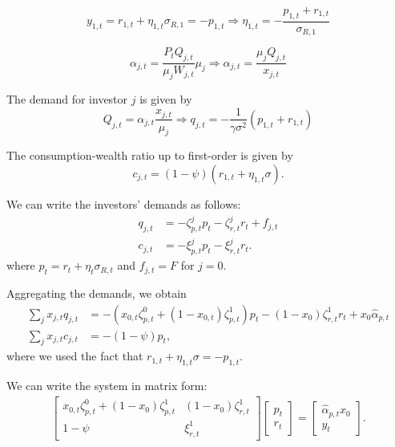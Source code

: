 \documentclass[11pt,english]{article}
\begin{document}
\begin{equation}
    y_{1,t} = r_{1,t} + \eta_{1,t} \sigma_{R,1} = - p_{1,t} \Rightarrow\eta_{1,t} = -\frac{p_{1,t}+r_{1,t}}{\sigma_{R,1}}
\end{equation}

\begin{equation}
    \alpha_{j,t} = \frac{P_t Q_{j,t}}{\mu_j W_{j,t}} \mu_j \Rightarrow \alpha_{j,t} = \frac{\mu_j Q_{j,t}}{x_{j,t}} 
\end{equation}

The demand for investor $j$ is given by
\begin{equation}
    Q_{j,t} = \alpha_{j,t} \frac{x_{j,t}}{\mu_j} \Rightarrow q_{j,t} =  - \frac{1}{\gamma \sigma^2} (p_{1,t}+r_{1,t})
\end{equation}

The consumption-wealth ratio up to first-order is given by
\begin{equation}
    c_{j,t} = (1-\psi) ( r_{1,t} + \eta_{1,t} \sigma). 
\end{equation}

We can write the investors' demands as follows:
\begin{align}
    q_{j,t} &= -\zeta_{p,t}^j p_t - \zeta_{r,t}^j r_t + f_{j,t}\\
    c_{j,t} &= -\xi_{p,t}^j p_t - \xi_{r,t}^j r_t.
\end{align}
where $p_t = r_t + \eta_t \sigma_{R,t}$ and $f_{j,t}=F$ for $j=0$.

Aggregating the demands, we obtain
\begin{align}
    \sum_{j} x_{j,t} q_{j,t} &= - (x_{0,t} \zeta_{p,t}^0 + (1-x_{0,t}) \zeta_{p,t}^1) p_t - (1-x_0) \zeta_{r,t}^1 r_t + x_0 \hat{\alpha}_{p,t}\\
    \sum_{j} x_{j,t} c_{j,t} &= -(1-\psi) p_t,
\end{align}
where we used the fact that $r_{1,t}+ \eta_{1,t} \sigma = - p_{1,t}$.

We can write the system in matrix form:
\begin{align}
    \left[
    \begin{matrix}
        x_{0,t} \zeta_{p,t}^0 + (1-x_0) \zeta_{p,t}^1 & (1-x_0) \zeta_{r,t}^1\\
        1-\psi & \xi_{r,t}^1
    \end{matrix}
    \right] \left[ 
  \begin{matrix}
      p_t\\
      r_t
  \end{matrix}  
    \right] = \left[ 
  \begin{matrix}
      \hat{\alpha}_{p,t} x_0 \\
      y_t
  \end{matrix}  
    \right]. 
\end{align}
\end{document}
